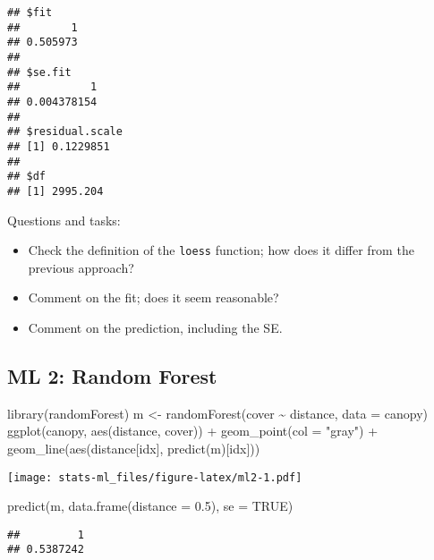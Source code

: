 \documentclass[
]{article}
\newenvironment{Shaded}{\begin{snugshade}}{\end{snugshade}}
\newcommand{\AttributeTok}[1]{\textcolor[rgb]{0.77,0.63,0.00}{#1}}
\newcommand{\ConstantTok}[1]{\textcolor[rgb]{0.00,0.00,0.00}{#1}}
\newcommand{\FloatTok}[1]{\textcolor[rgb]{0.00,0.00,0.81}{#1}}
\newcommand{\FunctionTok}[1]{\textcolor[rgb]{0.00,0.00,0.00}{#1}}
\newcommand{\NormalTok}[1]{#1}
\newcommand{\OtherTok}[1]{\textcolor[rgb]{0.56,0.35,0.01}{#1}}
\newcommand{\SpecialCharTok}[1]{\textcolor[rgb]{0.00,0.00,0.00}{#1}}
\newcommand{\StringTok}[1]{\textcolor[rgb]{0.31,0.60,0.02}{#1}}
\providecommand{\tightlist}{%
  \setlength{\itemsep}{0pt}\setlength{\parskip}{0pt}}
\begin{document}
\begin{verbatim}
## $fit
##        1 
## 0.505973 
## 
## $se.fit
##           1 
## 0.004378154 
## 
## $residual.scale
## [1] 0.1229851
## 
## $df
## [1] 2995.204
\end{verbatim}

Questions and tasks:

\begin{itemize}
\tightlist
\item
  Check the definition of the \texttt{loess} function; how does it
  differ from the previous approach?
\item
  Comment on the fit; does it seem reasonable?
\item
  Comment on the prediction, including the SE.
\end{itemize}

\hypertarget{ml-2-random-forest}{%
\subsection{ML 2: Random Forest}\label{ml-2-random-forest}}

\begin{Shaded}
\begin{Highlighting}[]
\FunctionTok{library}\NormalTok{(randomForest)}
\NormalTok{m }\OtherTok{\textless{}{-}} \FunctionTok{randomForest}\NormalTok{(cover }\SpecialCharTok{\textasciitilde{}}\NormalTok{ distance, }\AttributeTok{data =}\NormalTok{ canopy)}
\FunctionTok{ggplot}\NormalTok{(canopy, }\FunctionTok{aes}\NormalTok{(distance, cover)) }\SpecialCharTok{+} \FunctionTok{geom\_point}\NormalTok{(}\AttributeTok{col =} \StringTok{"gray"}\NormalTok{) }\SpecialCharTok{+}
  \FunctionTok{geom\_line}\NormalTok{(}\FunctionTok{aes}\NormalTok{(distance[idx], }\FunctionTok{predict}\NormalTok{(m)[idx]))}
\end{Highlighting}
\end{Shaded}

\texttt{[image: stats-ml\_files/figure-latex/ml2-1.pdf]}

\begin{Shaded}
\begin{Highlighting}[]
\FunctionTok{predict}\NormalTok{(m, }\FunctionTok{data.frame}\NormalTok{(}\AttributeTok{distance =} \FloatTok{0.5}\NormalTok{), }\AttributeTok{se =} \ConstantTok{TRUE}\NormalTok{)}
\end{Highlighting}
\end{Shaded}

\begin{verbatim}
##         1 
## 0.5387242
\end{verbatim}
\end{document}
